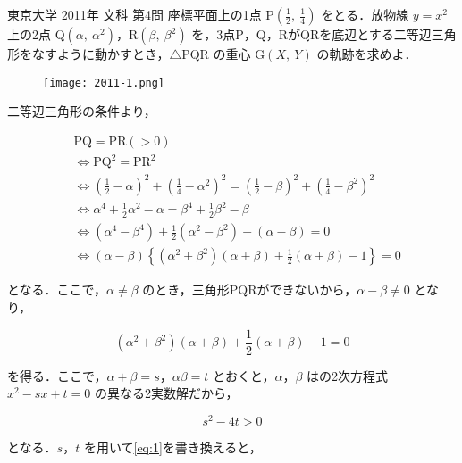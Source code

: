 \documentclass[a4paper]{ltjsarticle}
\begin{document}

\begin{itembox}[l]{東京大学 2011年 文科 第4問}
    座標平面上の1点 P$\left(\frac{1}{2},\ \frac{1}{4}\right)$ をとる．放物線 $y=x^2$ 上の2点 Q$(\alpha,\ \alpha^2)$，R$(\beta,\ \beta^2)$ を，3点P，Q，RがQRを底辺とする二等辺三角形をなすように動かすとき，$\triangle$PQR の重心 G$(X,\ Y)$ の軌跡を求めよ．
\end{itembox}

\begin{figure}[!ht]
    \centering
    \texttt{[image: 2011-1.png]}
\end{figure}

二等辺三角形の条件より，

\begin{align*}
     & \text{PQ}=\text{PR}(>0)                                                                                       \\
     & \Leftrightarrow \text{PQ}^2=\text{PR}^2                                                                       \\
     & \Leftrightarrow (\frac{1}{2}-\alpha)^2+(\frac{1}{4}-\alpha^2)^2=(\frac{1}{2}-\beta)^2+(\frac{1}{4}-\beta^2)^2 \\
     & \Leftrightarrow \alpha^4+\frac{1}{2}\alpha^2-\alpha=\beta^4+\frac{1}{2}\beta^2-\beta                          \\
     & \Leftrightarrow (\alpha^4-\beta^4)+\frac{1}{2}(\alpha^2-\beta^2)-(\alpha-\beta)=0                             \\
     & \Leftrightarrow (\alpha-\beta)\left\{(\alpha^2+\beta^2)(\alpha+\beta)+\frac{1}{2}(\alpha+\beta)-1\right\}=0
\end{align*}

となる．ここで，$\alpha\neq\beta$ のとき，三角形PQRができないから，$\alpha-\beta\neq 0$ となり，

\begin{equation}
    (\alpha^2+\beta^2)(\alpha+\beta)+\frac{1}{2}(\alpha+\beta)-1=0\label{eq:1}
\end{equation}

を得る．ここで，$\alpha+\beta=s$，$\alpha\beta=t$ とおくと，$\alpha$，$\beta$ はの2次方程式 $x^2-sx+t=0$ の異なる2実数解だから，

\begin{equation}
    s^2-4t>0\label{eq:2}
\end{equation}

となる．$s$，$t$ を用いて\eqref{eq:1}を書き換えると，
\end{document}

